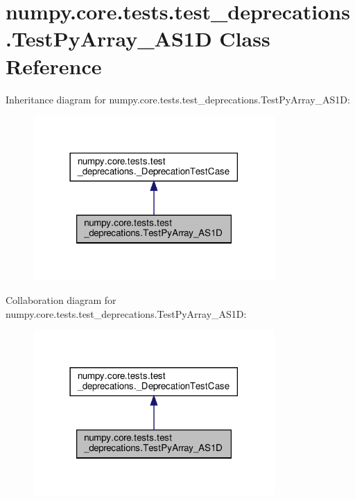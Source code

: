 \hypertarget{classnumpy_1_1core_1_1tests_1_1test__deprecations_1_1TestPyArray__AS1D}{}\section{numpy.\+core.\+tests.\+test\+\_\+deprecations.\+Test\+Py\+Array\+\_\+\+A\+S1D Class Reference}
\label{classnumpy_1_1core_1_1tests_1_1test__deprecations_1_1TestPyArray__AS1D}


Inheritance diagram for numpy.\+core.\+tests.\+test\+\_\+deprecations.\+Test\+Py\+Array\+\_\+\+A\+S1D\+:
\nopagebreak
\begin{figure}[H]
\begin{center}
\leavevmode
\includegraphics[width=261pt]{classnumpy_1_1core_1_1tests_1_1test__deprecations_1_1TestPyArray__AS1D__inherit__graph}
\end{center}
\end{figure}


Collaboration diagram for numpy.\+core.\+tests.\+test\+\_\+deprecations.\+Test\+Py\+Array\+\_\+\+A\+S1D\+:
\nopagebreak
\begin{figure}[H]
\begin{center}
\leavevmode
\includegraphics[width=261pt]{classnumpy_1_1core_1_1tests_1_1test__deprecations_1_1TestPyArray__AS1D__coll__graph}
\end{center}
\end{figure}
